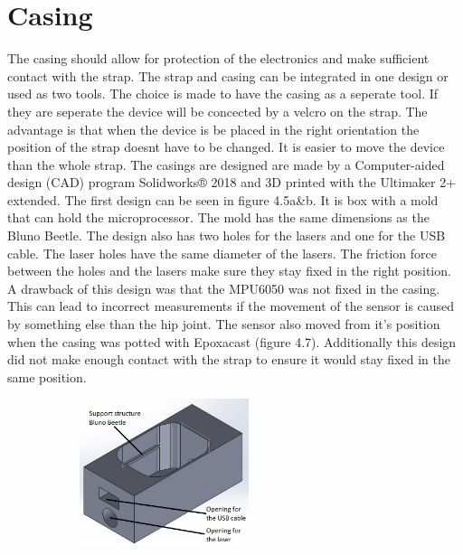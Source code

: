 \documentclass[whitelogo]{tudelft-report}
\begin{document}
{{{{\section{Casing}
The casing should allow for protection of the electronics and make sufficient contact with the strap. The strap and casing can be integrated in one design or used as two tools. The choice is made to have the casing as a seperate tool. If they are seperate the device will be concected by a velcro on the strap. The advantage is that when the device is be placed in the right orientation the position of the strap doesnt have to be changed. It is easier to move the device than the whole strap.
\newline
\newline
The casings are designed are made by a Computer-aided design (CAD) program Solidworks® 2018 and 3D printed with the Ultimaker 2+ extended. The first design can be seen in figure 4.5a&b. It is box with a mold that can hold the microprocessor. The mold has the same dimensions as the Bluno Beetle. The design also has two holes for the lasers and one for the USB cable. The laser holes have the same diameter of the lasers. The friction force between the holes and the lasers make sure they stay fixed in the right position.  
\newline
A drawback of this design was that the MPU6050 was not fixed in the casing. This can lead to incorrect measurements if the movement of the sensor is caused by something else than the hip joint. The sensor also moved from it's position when the casing was potted with Epoxacast (figure 4.7). Additionally this design did not make enough contact with the strap to ensure it would stay fixed in the same position.
\begin{figure}[htb]
	\centering
	\begin{subfigure}{0.45\linewidth}
		\centering\includegraphics[width=140pt]{casing/bluno_beetle_casing_v6_without_laser_holder.JPG}
		\caption{\label{fig:fig1}}
	\end{subfigure}%
	\begin{subfigure}{0.45\linewidth}

\end{subfigure}
\end{figure}}}}}
\end{document}
